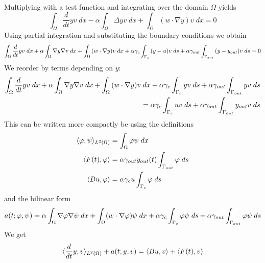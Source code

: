 \documentclass[
12pt, %
a4paper, %
onecolumn, %
portrait %
]{article}
\begin{document}
Multiplying with a test function and integrating over the domain $\Omega$ yields
\begin{equation}
\int_{\Omega} \frac{d}{dt}y v \; dx - \alpha \int_{\Omega} \Delta y v \; dx + \int_{\Omega} (w \cdot \nabla y) v \; dx  = 0
\end{equation}
Using partial integration and substituting the boundary conditions we obtain
\begin{equation}
\int_{\Omega} {\frac{d}{dt}{y}}{v} \; dx + \alpha \int_{\Omega} {\nabla y}{\nabla v} \; dx + \int_{\Omega} {(w \cdot \nabla y)}{v} \; dx + \alpha \gamma_{c} \int_{\Gamma_{c}} {(y - u)}{v} \; ds + \alpha \gamma_{out} \int_{\Gamma_{out}} {(y -  {y_{out}})}{v} \; ds = 0
\end{equation}
We reorder by terms depending on $y$:
\begin{align*}
\int_{\Omega} {\frac{d}{dt}{y}}{v} \; dx + \alpha \int_{\Omega} {\nabla y}{\nabla v} \; dx + \int_{\Omega} {(w \cdot \nabla y)}{v} \; dx + \alpha \gamma_{c} \int_{\Gamma_{c}} {y}{v} \; ds + \alpha \gamma_{out} \int_{\Gamma_{out}} {y}{v} \; ds \\
= \alpha \gamma_{c} \int_{\Gamma_{c}} {u}{v} \; ds + \alpha \gamma_{out} \int_{\Gamma_{out}} {{y_{out}}}{v} \; ds
\end{align*}
This can be written more compactly be using the definitions 
\begin{align*}
\langle{\varphi},{\psi}\rangle_{L^2(\Omega)} &= \int_{\Omega} {\varphi}{\psi} \; dx \\
\langle F(t), {\varphi} \rangle &= \alpha \gamma_{out} {{y_{out}}(t)} \int_{\Gamma_{out}} {}{\varphi} \; ds \\
\langle B {u}, {\varphi} \rangle &= \alpha \gamma_{c} {u} \int_{\Gamma_{c}} {}{\varphi} \; ds
\end{align*}
and the bilinear form
\begin{equation}
a(t; {\varphi},{\psi}) = \alpha \int_{\Omega} {\nabla {\varphi}}{\nabla {\psi}} \; dx + \int_{\Omega} (w \cdot \nabla {\varphi}) {\psi} \; dx + \alpha\gamma_{c} \int_{\Gamma_{c}} {{\varphi}}{{\psi}} \; ds + \alpha \gamma_{out} \int_{\Gamma_{out}} {{\varphi}}{{\psi}} \; ds
\end{equation}
We get
\begin{equation}
\ltwosp{\dt{y}}{v} + \at{y}{v} = \Bt{u}{v} + \Ft{v}
\label{eq:fem-system}
\end{equation}
\end{document}
